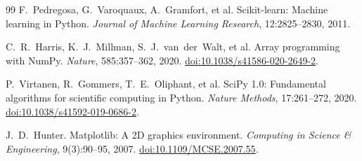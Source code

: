 \documentclass[journal]{IEEEtran}
\begin{document}
\begin{thebibliography}{99}
F.~Pedregosa, G.~Varoquaux, A.~Gramfort, et al.
Scikit-learn: Machine learning in Python.
\emph{Journal of Machine Learning Research}, 12:2825--2830, 2011.

C.~R.~Harris, K.~J.~Millman, S.~J.~van~der~Walt, et al.
Array programming with NumPy.
\emph{Nature}, 585:357--362, 2020.
\href{https://doi.org/10.1038/s41586-020-2649-2}{doi:10.1038/s41586-020-2649-2}.

P.~Virtanen, R.~Gommers, T.~E.~Oliphant, et al.
SciPy 1.0: Fundamental algorithms for scientific computing in Python.
\emph{Nature Methods}, 17:261--272, 2020.
\href{https://doi.org/10.1038/s41592-019-0686-2}{doi:10.1038/s41592-019-0686-2}.

J.~D.~Hunter.
Matplotlib: A 2D graphics environment.
\emph{Computing in Science \& Engineering}, 9(3):90--95, 2007.
\href{https://doi.org/10.1109/MCSE.2007.55}{doi:10.1109/MCSE.2007.55}.

\end{thebibliography}
\end{document}
